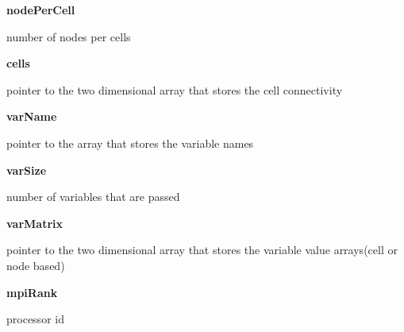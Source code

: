 \documentclass{article}
\begin{document}
        {\bf nodePerCell} \par number of nodes per cells 
\medskip
        
        {\bf cells} \par pointer to the two dimensional array that stores the cell connectivity
\medskip
        
        {\bf varName} \par pointer to the array that stores the variable names
\medskip
        
        {\bf varSize} \par number of variables that are passed 
\medskip
        
        {\bf varMatrix} \par pointer to the two dimensional array that stores the variable value arrays(cell or node based) 
\medskip
        
        {\bf mpiRank} \par processor id 

        


%
%
\end{document}
